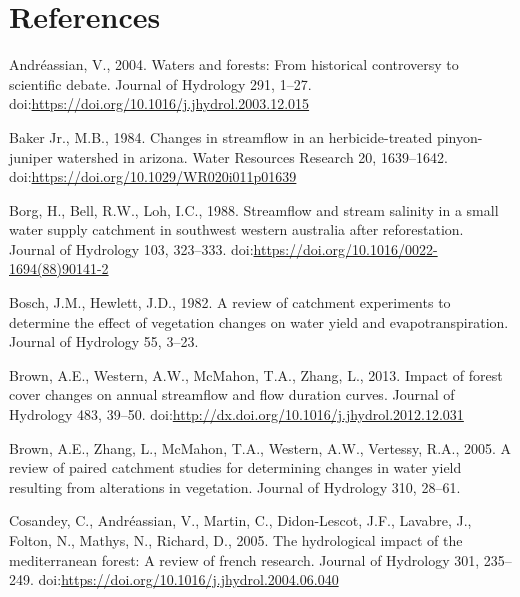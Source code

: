 \documentclass[]{elsarticle} %
\newlength{\cslhangindent}
\newlength{\cslentryspacingunit} %
\newenvironment{CSLReferences}[2] %
 {%
  \setlength{\parindent}{0pt}
  \ifodd #1
  \let\oldpar\par
  \def\par{\hangindent=\cslhangindent\oldpar}
  \fi
  \setlength{\parskip}{#2\cslentryspacingunit}
 }%
 {}
\begin{document}
\hypertarget{references}{%
\section*{References}\label{references}}

\hypertarget{refs}{}
\begin{CSLReferences}{1}{0}
\leavevmode{}%
Andréassian, V., 2004. Waters and forests: From historical controversy to scientific debate. Journal of Hydrology 291, 1--27. doi:\url{https://doi.org/10.1016/j.jhydrol.2003.12.015}

\leavevmode{}%
Baker Jr., M.B., 1984. Changes in streamflow in an herbicide-treated pinyon-juniper watershed in arizona. Water Resources Research 20, 1639--1642. doi:\url{https://doi.org/10.1029/WR020i011p01639}

\leavevmode{}%
Borg, H., Bell, R.W., Loh, I.C., 1988. Streamflow and stream salinity in a small water supply catchment in southwest western australia after reforestation. Journal of Hydrology 103, 323--333. doi:\url{https://doi.org/10.1016/0022-1694(88)90141-2}

\leavevmode{}%
Bosch, J.M., Hewlett, J.D., 1982. A review of catchment experiments to determine the effect of vegetation changes on water yield and evapotranspiration. Journal of Hydrology 55, 3--23.

\leavevmode{}%
Brown, A.E., Western, A.W., McMahon, T.A., Zhang, L., 2013. Impact of forest cover changes on annual streamflow and flow duration curves. Journal of Hydrology 483, 39--50. doi:\url{http://dx.doi.org/10.1016/j.jhydrol.2012.12.031}

\leavevmode{}%
Brown, A.E., Zhang, L., McMahon, T.A., Western, A.W., Vertessy, R.A., 2005. A review of paired catchment studies for determining changes in water yield resulting from alterations in vegetation. Journal of Hydrology 310, 28--61.

\leavevmode{}%
Cosandey, C., Andréassian, V., Martin, C., Didon-Lescot, J.F., Lavabre, J., Folton, N., Mathys, N., Richard, D., 2005. The hydrological impact of the mediterranean forest: A review of french research. Journal of Hydrology 301, 235--249. doi:\url{https://doi.org/10.1016/j.jhydrol.2004.06.040}


\end{CSLReferences}
\end{document}
